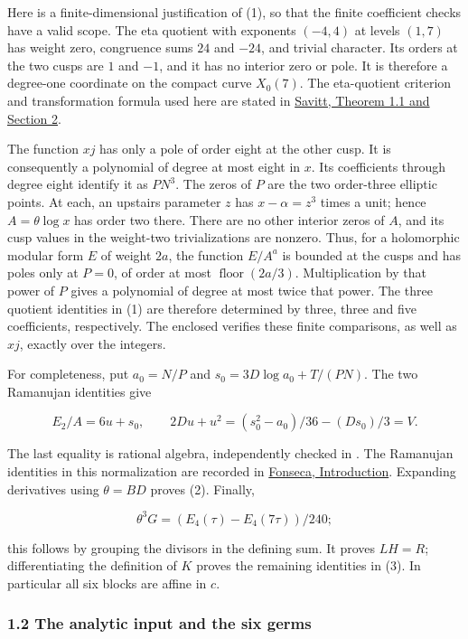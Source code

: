 \documentclass[11pt,a4paper]{article}
\begin{document}
Here is a finite-dimensional justification of (1), so that the finite coefficient checks have a valid scope. The eta quotient with exponents \((-4,4)\) at levels \((1,7)\) has weight zero, congruence sums \(24\) and \(-24\), and trivial character. Its orders at the two cusps are \(1\) and \(-1\), and it has no interior zero or pole. It is therefore a degree-one coordinate on the compact curve \(X_{0}(7)\). The eta-quotient criterion and transformation formula used here are stated in \href{https://arxiv.org/pdf/2507.16225}{Savitt, Theorem 1.1 and Section 2}.

The function \(xj\) has only a pole of order eight at the other cusp. It is consequently a polynomial of degree at most eight in \(x\). Its coefficients through degree eight identify it as \(PN^{3}\). The zeros of \(P\) are the two order-three elliptic points. At each, an upstairs parameter \(z\) has \(x-α=z^{3}\) times a unit; hence \(A=θ \operatorname{log} x\) has order two there. There are no other interior zeros of \(A\), and its cusp values in the weight-two trivializations are nonzero. Thus, for a holomorphic modular form \(E\) of weight \(2a\), the function \(E/A^a\) is bounded at the cusps and has poles only at \(P=0\), of order at most \(\operatorname{floor}(2a/3)\). Multiplication by that power of \(P\) gives a polynomial of degree at most twice that power. The three quotient identities in (1) are therefore determined by three, three and five coefficients, respectively. The enclosed  verifies these finite comparisons, as well as \(xj\), exactly over the integers.

For completeness, put \(a_{0}=N/P\) and \(s_{0}=3D \operatorname{log} a_{0}+T/(PN)\). The two Ramanujan identities give

\[
E_2/A=6u+s_0,\qquad
2Du+u^2=(s_0^2-a_0)/36-(Ds_0)/3=V.
\]

The last equality is rational algebra, independently checked in . The Ramanujan identities in this normalization are recorded in \href{https://arxiv.org/pdf/1612.05081}{Fonseca, Introduction}. Expanding derivatives using \(θ=BD\) proves (2). Finally,

\[
\theta^3G=(E_4(\tau)-E_4(7\tau))/240;
\]

this follows by grouping the divisors in the defining sum. It proves \(LH=R\); differentiating the definition of \(K\) proves the remaining identities in (3). In particular all six blocks are affine in \(c\).

\hypertarget{the-analytic-input-and-the-six-germs}{%
\subsubsection{1.2 The analytic input and the six germs}\label{the-analytic-input-and-the-six-germs}}
\end{document}
